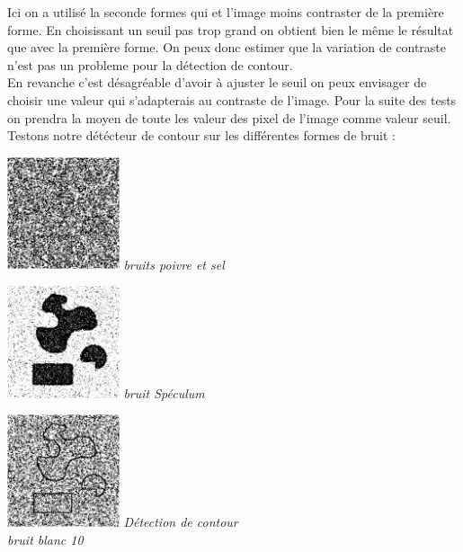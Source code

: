 \documentclass[a4,12pt]{article}
\begin{document}
Ici on a utilisé la seconde formes qui et l'image moins contraster de la première forme. En choisissant un seuil pas trop grand on obtient bien le même le résultat 
que avec la première forme.
On peux donc estimer que la variation de contraste n'est pas un probleme pour la détection de contour.\\
En revanche c'est désagréable d'avoir à ajuster le seuil on peux envisager de choisir une valeur qui s'adapterais au contraste de l'image.
Pour la suite des tests on prendra la moyen de toute les valeur des pixel de l'image comme valeur seuil.\\
Testons notre détécteur de contour sur les différentes formes de bruit :\\
	
\noindent
\begin{center}
\begin{minipage}[c]{0.20\linewidth}
	\begin{center}
		\includegraphics[width = 33mm]{./img/p2test_grad_mean_formes2pets5.jpg}
		\textit{bruits poivre et sel}
	\end{center}
\end{minipage}
\begin{minipage}[c]{0.20\linewidth}
	\begin{center}
		\includegraphics[width = 33mm]{./img/p2test_grad_mean_formes1sp.jpg}
		\textit{bruit Spéculum}
	\end{center}
\end{minipage}
\begin{minipage}[c]{0.20\linewidth}
	\begin{center}
		\includegraphics[width = 33mm]{./img/p2test_grad_mean_formes2bb10.jpg}
		\textit{Détection de contour \\bruit blanc 10}
	\end{center}
\end{minipage}
\end{center}
\end{document}

